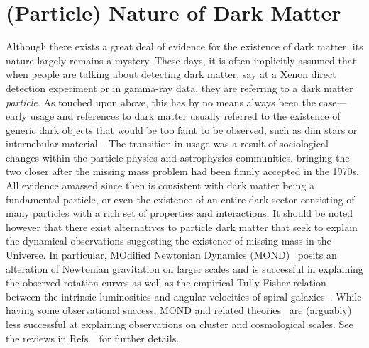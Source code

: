 \section{(Particle) Nature of Dark Matter}
\label{sec:particledm}

Although there exists a great deal of evidence for the existence of dark matter, its nature largely remains a mystery. These days, it is often implicitly assumed that when people are talking about detecting dark matter, say at a Xenon direct detection experiment or in gamma-ray data, they are referring to a dark matter \emph{particle}. As touched upon above, this has by no means always been the case---early usage and references to dark matter usually referred to the existence of generic dark objects that would be too faint to be observed, such as dim stars or internebular material~\cite{1937ApJ....86..217Z}. The transition in usage was a result of sociological changes within the particle physics and astrophysics communities, bringing the two closer after the missing mass problem had been firmly accepted in the 1970s. All evidence amassed since then is consistent with dark matter being a fundamental particle, or even the existence of an entire dark sector consisting of many particles with a rich set of properties and interactions. It should be noted however that there exist alternatives to particle dark matter that seek to explain the dynamical observations suggesting the existence of missing mass in the Universe. In particular, MOdified Newtonian Dynamics (MOND)~\cite{1983ApJ...270..365M,1983ApJ...270..371M,1983ApJ...270..384M} posits an alteration of Newtonian gravitation on larger scales and is successful in explaining the observed rotation curves as well as the empirical Tully-Fisher relation between the intrinsic luminosities and angular velocities of spiral galaxies~\cite{1977A&A....54..661T}. While having some observational success, MOND and related theories~\cite{Bekenstein:2004ne} are (arguably) less successful at explaining observations on cluster and cosmological scales. See the reviews in Refs.~\cite{2009CQGra..26n3001S,Famaey:2011kh} for further details.

